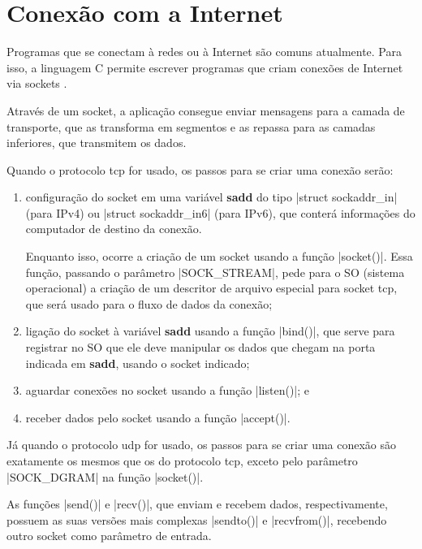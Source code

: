 
\section{Conexão com a Internet}

Programas que se conectam à redes ou à Internet são comuns atualmente. Para isso, a
linguagem C permite escrever programas que criam conexões de Internet via \glspl{socket}
\cite{site:beej}.

Através de um \gls*{socket}, a aplicação consegue enviar mensagens para a camada de
transporte, que as transforma em segmentos e as repassa para as camadas inferiores, que
transmitem os dados.

Quando o protocolo \gls{tcp} for usado, os passos para se criar uma conexão serão:

\begin{enumerate}
    \item configuração do \gls*{socket} em uma variável \textbf{sadd} do tipo
        \sverb|struct sockaddr_in| (para IPv4) ou \sverb|struct sockaddr_in6| (para
        IPv6), que conterá informações do computador de destino da conexão.

        Enquanto isso, ocorre a criação de um \gls*{socket} usando a função
        \sverb|socket()|. Essa função, passando o parâmetro \bverb|SOCK_STREAM|, pede
        para o SO (sistema operacional) a criação de um descritor de arquivo especial
        para \gls*{socket} \gls*{tcp}, que será usado para o fluxo de dados da conexão;

    \item ligação do \gls*{socket} à variável \textbf{sadd} usando a função
        \sverb|bind()|, que serve para registrar no SO que ele deve manipular os dados
        que chegam na porta indicada em \textbf{sadd}, usando o \gls*{socket} indicado;

    \item aguardar conexões no \gls*{socket} usando a função \sverb|listen()|; e

    \item receber dados pelo \gls*{socket} usando a função \sverb|accept()|.
\end{enumerate}



Já quando o protocolo \gls{udp} for usado, os passos para se criar uma conexão são
exatamente os mesmos que os do protocolo \gls*{tcp}, exceto pelo parâmetro
\bverb|SOCK_DGRAM| na função \sverb|socket()|.


As funções \sverb|send()| e \sverb|recv()|, que enviam e recebem dados, respectivamente,
possuem as suas versões mais complexas \sverb|sendto()| e \sverb|recvfrom()|, recebendo
outro \gls*{socket} como parâmetro de entrada.